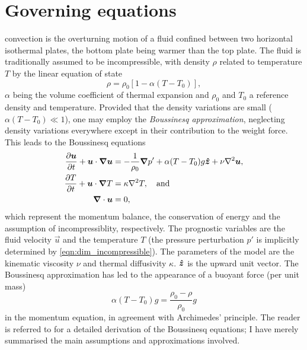 \documentclass[../main.tex]{subfiles}
\begin{document}

\section{Governing equations}
\rb{} convection is the overturning motion of a fluid confined between two
horizontal isothermal plates, the bottom plate being warmer than the top plate.
The fluid is traditionally assumed to be incompressible, with density $\rho$
related to temperature $T$ by the linear equation of state
\[
    \rho = \rho_0 [1 - \alpha(T - T_0)],
\]
$\alpha$ being the volume coefficient of thermal expansion and $\rho_0$ and
$T_0$ a reference density and temperature. Provided that the density variations
are small ($\alpha (T - T_0) \ll 1$), one may employ the \emph{Boussinesq
approximation}, neglecting density variations everywhere except in their
contribution to the weight force. This leads to the Boussinesq equations
\begin{align}
    \label{eqn:dim_momentum}
    \frac{\partial \bm{u}}{\partial t} + \bm{u} \cdot \bm{\nabla} \bm{u}
        &= -\frac{1}{\rho_0} \bm{\nabla} p' + \alpha (T - T_0) g \bm{\hat{z}}
            + \nu \nabla^2 \bm{u}, \\
    \label{eqn:dim_energy}
    \frac{\partial T}{\partial t} + \bm{u} \cdot \bm{\nabla} T &= \kappa \nabla^2 T,
        \quad \text{and} \\
    \label{eqn:dim_incompressible}
    \bm{\nabla} \cdot \bm{u} &= 0,
\end{align}
which represent the momentum balance, the conservation of energy and the
assumption of incompressiblity, respectively. The prognostic variables are the
fluid velocity $\vec{u}$ and the temperature $T$ (the pressure perturbation
$p'$ is implicitly determined by \cref{eqn:dim_incompressible}). The parameters
of the model are the kinematic viscosity $\nu$ and thermal diffusivity
$\kappa$. $\bm{\hat{z}}$ is the upward unit vector. The Boussinesq approximation
has led to the appearance of a buoyant force (per unit mass)
\[
    \alpha (T - T_0) g = \frac{\rho_0 - \rho}{\rho_0} g
\]
in the momentum equation, in agreement with Archimedes' principle. The reader
is referred to \textcite{chandrasekhar1961} for a detailed derivation of the
Boussinesq equations; I have merely summarised the main assumptions and
approximations involved.
\end{document}
